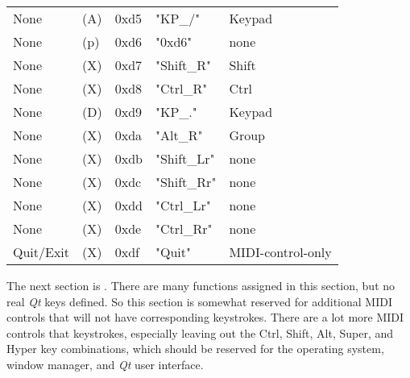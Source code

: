 \begin{table}[htb!]
\begin{tabular}{l l l l l}
        None               & (A)  &  0xd5   & "KP\_/"      & Keypad \\
        None               & (p)  &  0xd6   & "0xd6"       & none \\
        None               & (X)  &  0xd7   & "Shift\_R"   & Shift \\
        None               & (X)  &  0xd8   & "Ctrl\_R"    & Ctrl \\
        None               & (D)  &  0xd9   & "KP\_."      & Keypad \\
        None               & (X)  &  0xda   & "Alt\_R"     & Group \\
        None               & (X)  &  0xdb   & "Shift\_Lr"  & none \\
        None               & (X)  &  0xdc   & "Shift\_Rr"  & none \\
        None               & (X)  &  0xdd   & "Ctrl\_Lr"   & none \\
        None               & (X)  &  0xde   & "Ctrl\_Rr"   & none \\
        Quit/Exit          & (X)  &  0xdf   & "Quit"       & MIDI-control-only \\
      \end{tabular}
   \end{table}

   The next section is .
   There are many functions assigned in this section, but no
   real \textsl{Qt} keys defined.  So this section is somewhat reserved
   for additional MIDI controls that will not have corresponding keystrokes.
   There are a lot more MIDI controls that keystrokes, especially leaving out the
   Ctrl, Shift, Alt, Super, and Hyper key combinations, which should be
   reserved for the operating system, window manager, and
   \textsl{Qt} user interface.

